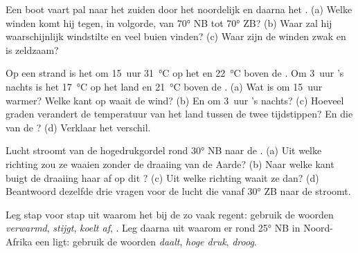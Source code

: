 \begin{exercise}[$\star\star$]\label{exo:g8:winds-global-circulation:6}
Een boot vaart pal naar het zuiden door het noordelijk en daarna het
. (a) Welke winden komt hij tegen, in volgorde, van
\ang{70} NB tot \ang{70} ZB? (b) Waar zal hij waarschijnlijk windstilte en
veel buien vinden? (c) Waar zijn de winden zwak en is  zeldzaam?
\end{exercise}

\begin{exercise}[$\star\star$]\label{exo:g8:winds-global-circulation:7}
Op een strand is het om 15~uur \qty{31}{\degreeCelsius} op het  en
\qty{22}{\degreeCelsius} boven de . Om 3~uur 's nachts is het
\qty{17}{\degreeCelsius} op het land en \qty{21}{\degreeCelsius} boven de
. (a) Wat is om 15~uur warmer? Welke kant op waait de wind? (b) En om
3~uur 's nachts? (c) Hoeveel graden verandert de temperatuur van het land
tussen de twee tijdstippen? En die van de ? (d) Verklaar het verschil.
\end{exercise}

\begin{exercise}[$\star\star$]\label{exo:g8:winds-global-circulation:8}
Lucht stroomt van de hogedrukgordel rond \ang{30} NB naar de .
(a) Uit welke richting zou ze waaien zonder de draaiing van de Aarde?
(b) Naar welke kant buigt de draaiing haar af op dit ? (c) Uit
welke richting waait ze dan? (d) Beantwoord dezelfde drie vragen voor de
lucht die vanaf \ang{30} ZB naar de  stroomt.
\end{exercise}

\begin{exercise}[$\star\star$]\label{exo:g8:winds-global-circulation:9}
Leg stap voor stap uit waarom het bij de  zo vaak regent: gebruik de
woorden \emph{verwarmd}, \emph{stijgt}, \emph{koelt af}, \emph{}. Leg
daarna uit waarom er rond \ang{25} NB in Noord-Afrika een  ligt:
gebruik de woorden \emph{daalt}, \emph{hoge druk}, \emph{droog}.
\end{exercise}

